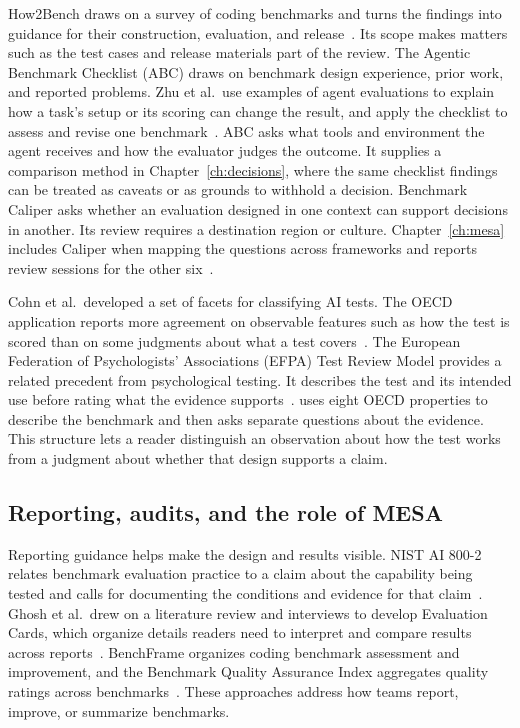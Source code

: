 How2Bench draws on a survey of coding benchmarks and turns the findings into guidance for their construction, evaluation, and release~\cite{cao_how2bench_2025}. Its scope makes matters such as the test cases and release materials part of the review. The Agentic Benchmark Checklist (ABC) draws on benchmark design experience, prior work, and reported problems. Zhu et al.\ use examples of agent evaluations to explain how a task's setup or its scoring can change the result, and apply the checklist to assess and revise one benchmark~\cite{zhu_agentic_benchmark_checklist_2025}. ABC asks what tools and environment the agent receives and how the evaluator judges the outcome. It supplies a comparison method in Chapter~\ref{ch:decisions}, where the same checklist findings can be treated as caveats or as grounds to withhold a decision. Benchmark Caliper asks whether an evaluation designed in one context can support decisions in another. Its review requires a destination region or culture. Chapter~\ref{ch:mesa} includes Caliper when mapping the questions across frameworks and reports review sessions for the other six~\cite{corona_benchmark_caliper_2026}.

Cohn et al.\ developed a set of facets for classifying AI tests. The OECD application reports more agreement on observable features such as how the test is scored than on some judgments about what a test covers~\cite{cohn_categorising_2022,cohn_hernandez_orallo_oecd_2023}. The European Federation of Psychologists' Associations (EFPA) Test Review Model provides a related precedent from psychological testing. It describes the test and its intended use before rating what the evidence supports~\cite{efpa_test_review_model_2025}. \mesa{} uses eight OECD properties to describe the benchmark and then asks separate questions about the evidence. This structure lets a reader distinguish an observation about how the test works from a judgment about whether that design supports a claim.

\subsection{Reporting, audits, and the role of MESA}

Reporting guidance helps make the design and results visible. NIST AI 800-2 relates benchmark evaluation practice to a claim about the capability being tested and calls for documenting the conditions and evidence for that claim~\cite{nist_ai_800_2_2026}. Ghosh et al.\ drew on a literature review and interviews to develop Evaluation Cards, which organize details readers need to interpret and compare results across reports~\cite{ghosh_evaluation_cards_2026}. BenchFrame organizes coding benchmark assessment and improvement, and the Benchmark Quality Assurance Index aggregates quality ratings across benchmarks~\cite{koohestani_benchframe_2025,gomez_bqai_2026}. These approaches address how teams report, improve, or summarize benchmarks.

